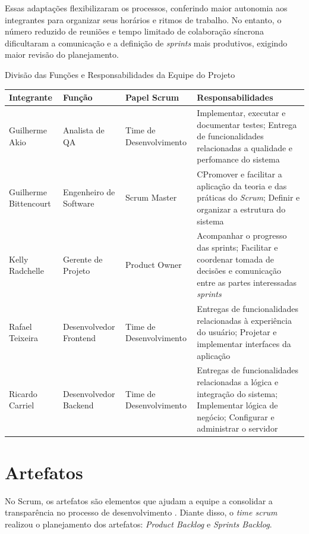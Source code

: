 \documentclass[
	12pt,				%
	openany,			%
	oneside,			%
	a4paper,			%
	english,			%
	french,				%
	spanish,			%
	brazil				%
	]{abntex2}
\renewcommand{\arraystretch}{1.4}
\begin{document}
Essas adaptações flexibilizaram os processos, conferindo maior autonomia aos integrantes para organizar seus horários e ritmos de trabalho. No entanto, o número reduzido de reuniões e tempo limitado de colaboração síncrona dificultaram a comunicação e a definição de \textit{sprints} mais produtivos, exigindo maior revisão do planejamento.
%	
\begin{quadro}[H]
	\caption{Divisão das Funções e Responsabilidades da Equipe do Projeto}
	\label{quadro_funcao_responsabilidade}
	\renewcommand{\arraystretch}{1.3} %
	\begin{tabular}{|>{\raggedright\arraybackslash}m{3cm} 
			|>{\raggedright\arraybackslash}m{2.6cm} |>{\raggedright\arraybackslash}m{2.6cm} 
			|>{\raggedright\arraybackslash}m{6cm}|}
		\hline
		\textbf{Integrante} & \textbf{Função} &  \textbf{Papel Scrum}& \textbf{Responsabilidades} \\ \hline
		Guilherme Akio & Analista de QA & Time de Desenvolvimento & Implementar, executar e documentar testes; Entrega de funcionalidades relacionadas a qualidade e perfomance do sistema  
		\\ \hline
		Guilherme Bittencourt & Engenheiro de Software & Scrum Master & CPromover e facilitar a aplicação da teoria e das práticas do \textit{Scrum}; Definir e organizar a estrutura do sistema
		\\ \hline
		Kelly Radchelle & Gerente de Projeto & Product Owner & Acompanhar o progresso das sprints; Facilitar e coordenar tomada de decisões e comunicação entre as partes interessadas \textit{sprints} 
		 \\ \hline
		Rafael Teixeira & Desenvolvedor Frontend &  Time de Desenvolvimento & Entregas de funcionalidades relacionadas à experiência do usuário; Projetar e implementar interfaces da aplicação
		\\ \hline
		Ricardo Carriel & Desenvolvedor Backend &  Time de Desenvolvimento & Entregas de funcionalidades relacionadas a lógica e integração do sistema;  Implementar lógica de negócio; Configurar e administrar o servidor
		\\ \hline
	\end{tabular}
\end{quadro}
\section{Artefatos}
No Scrum,  os artefatos são elementos que ajudam a equipe a consolidar a transparência no processo de desenvolvimento  \cite{scrumguide}. Diante disso, o \textit {time scrum} realizou o planejamento dos artefatos:  \textit {Product Backlog} e \textit {Sprints Backlog}.
%
\end{document}
